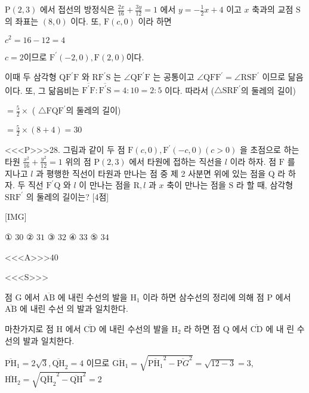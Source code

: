 \documentclass{oblivoir}
\begin{document}
$ \mathrm{P}(2,3)$ 에서 접선의 방정식은 $\frac{2 x}{16}+\frac{3 y}{12}=1$ 에서 $y=-\frac{1}{2} x+4$ 이고 $x$ 축과의 교점 $\mathrm{S}$ 의 좌표는 $(8,0)$ 이다.
또, $\mathrm{F}(c, 0)$ 이라 하면

$c^{2}=16-12=4$

$c=2$이므로 $\mathrm{F}^{\prime}(-2,0), \mathrm{F}(2,0)$이다.

이때 두 삼각형 $\mathrm{QF}^{\prime} \mathrm{F}$ 와 $\mathrm{RF}^{\prime} \mathrm{S}$ 는 $\angle \mathrm{QF}^{\prime} \mathrm{F}$ 는 공통이고 $\angle \mathrm{QFF}^{\prime}=\angle \mathrm{RSF}^{\prime}$ 이므로 닮음이다.
또, 그 닮음비는 $\overline{\mathrm{F}^{\prime} \mathrm{F}}: \overline{\mathrm{F}^{\prime} \mathrm{S}}=4: 10=2: 5$ 이다.
따라서 ($\triangle \mathrm{SRF}^{\prime}$의 둘레의 길이)

$=\frac{5}{2} \times$ ( $\triangle \mathrm{FQF}^{\prime}$의 둘레의 길이)

$=\frac{5}{2} \times(8+4)=30$


<<<P>>>28. 그림과 같이 두 점 $\mathrm{F}(c, 0), \mathrm{F}^{\prime}(-c, 0)(c>0)$ 을 초점으로 하는 타원 $\frac{x^{2}}{16}+\frac{y^{2}}{12}=1$ 위의 점 $\mathrm{P}(2,3)$ 에서 타원에 접하는 직선을 $l$ 이라 하자. 점 $\mathrm{F}$ 를 지나고 $l$ 과 평행한 직선이 타원과 만나는 점 중 제 2 사분면 위에 있는 점을 $\mathrm{Q}$ 라 하자. 두 직선 $\mathrm{F}^{\prime} \mathrm{Q}$ 와 $l$ 이 만나는 점을 $\mathrm{R}, l$ 과 $x$ 축이 만나는 점을 $\mathrm{S}$ 라 할 때, 삼각형 $\mathrm{SRF}^{\prime}$ 의 둘레의 길이는? [4점]


[IMG]

① $30$
② $31$
③ $32$
④ $33$
⑤ $34$



<<<A>>>$40$

<<<S>>>



점 $\mathrm{G}$ 에서 $\overline{\mathrm{AB}}$ 에 내린 수선의 발을 $\mathrm{H}_{1}$ 이라 하면 삼수선의 정리에 의해 점 $\mathrm{P}$ 에서 $\overline{\mathrm{AB}}$ 에 내린 수선 의 발과 일치한다.

마찬가지로 점 $\mathrm{H}$ 에서 $\overline{\mathrm{CD}}$ 에 내린 수선의 발을 $\mathrm{H}_{2}$ 라 하면 점 $\mathrm{Q}$ 에서 $\overline{\mathrm{CD}}$ 에 내 린 수선의 발과 일치한다.

$\overline{\mathrm{PH}}_{1}=2 \sqrt{3}, \overline{\mathrm{QH}}_{2}=4$ 이므로
$\overline{\mathrm{GH}_{1}}=\sqrt{\overline{\mathrm{PH}_{1}}^{2}-\overline{\mathrm{P} G}^{2}}=\sqrt{12-3}=3$,
$\overline{\mathrm{HH}}_{2}=\sqrt{\overline{\mathrm{QH}_{2}}^{2}-\overline{\mathrm{QH}}^{2}}=2$
\end{document}
